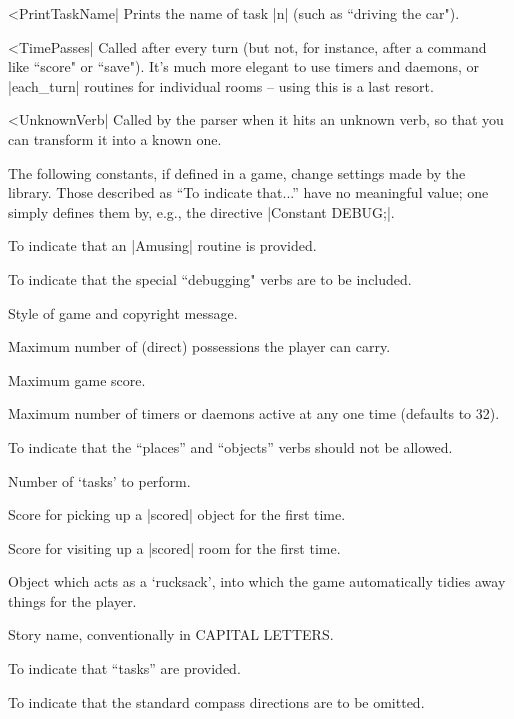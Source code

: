 ^^|PrintTaskName|
Prints the name of task |n| (such as ``driving the car").

^^|TimePasses|
Called after every turn (but not, for instance, after a command like
``score" or ``save").  It's much more elegant to use timers and daemons, or
|each_turn| routines for individual rooms -- using this is a last resort.

^^|UnknownVerb|
Called by the parser when it hits an unknown verb,
so that you can transform it into a known one.

\bigskip\noindent
The following constants, if defined in a game, change settings made by the
library.  Those described as ``To indicate that...'' have no meaningful
value; one simply defines them by, e.g., the directive |Constant DEBUG;|.

\bigskip\stepin=90pt

To indicate that an |Amusing| routine is provided.

To indicate that the special ``debugging" verbs are to be
included.

Style of game and copyright message.

Maximum number of (direct) possessions the player can
carry.

Maximum game score.

Maximum number of timers or daemons active at any one time
(defaults to 32).

To indicate that the ``places'' and ``objects'' verbs
should not be allowed.

Number of `tasks' to perform.

Score for picking up a |scored| object for the first
time.

Score for visiting up a |scored| room for the first time.

Object which acts as a `rucksack', into which the game
automatically tidies away things for the player.

Story name, conventionally in CAPITAL LETTERS.

To indicate that ``tasks'' are provided.

To indicate that the standard compass directions
are to be omitted.

